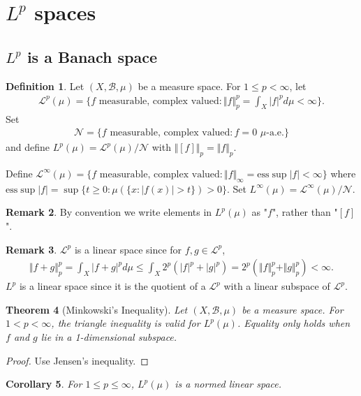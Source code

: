 \documentclass[11pt]{amsart}
\newtheorem{theorem}{Theorem}[section]
\newtheorem{corollary}[theorem]{Corollary}
\theoremstyle{definition}
\newtheorem{definition}[theorem]{Definition}
\newtheorem{remark}[theorem]{Remark}
\numberwithin{equation}{section}
\begin{document}
\section{\texorpdfstring{$L^p$}{Lp} spaces}
\subsection{\texorpdfstring{$L^p$}{Lp} is a Banach space}
\begin{definition}
    Let $(X,\mathcal B,\mu)$ be a measure space. For $1\le p<\infty$, let
    \begin{align*}
        \mathcal L^p(\mu)=\{f\text{ measurable, complex valued}:\Vert f\Vert_p^p=\int_X|f|^pd\mu<\infty\}.
    \end{align*}
    Set 
    \begin{align*}
        \mathcal N=\{f\text{ measurable, complex valued}:f=0\,\,\mu\text{-a.e.}\}
    \end{align*}
    and define $L^p(\mu)=\mathcal L^p(\mu)/\mathcal N$ with $\Vert [f]\Vert_p=\Vert f\Vert_p$.

    Define $\mathcal L^\infty(\mu)=\{f\text{ measurable, complex valued}:\Vert f\Vert_\infty=\mathrm{ess}\sup|f|<\infty\}$ where $\mathrm{ess}\sup|f|=\sup\{t\ge 0:\mu(\{x:|f(x)|>t\})>0\}$. Set $L^\infty(\mu)=\mathcal L^\infty(\mu)/\mathcal N$.
\end{definition}
\begin{remark}
    By convention we write elements in $L^p(\mu)$ as "$f$", rather than "$[f]$".
\end{remark}
\begin{remark}
    $\mathcal L^p$ is a linear space since for $f,g\in \mathcal L^p$, 
    \begin{align*}
        \Vert f+g\Vert_p^p=\int_X|f+g|^pd\mu\le\int_X2^p(|f|^p+|g|^p)=2^p(\Vert f\Vert_p^p+\Vert g\Vert_p^p)<\infty.
    \end{align*}
    $L^p$ is a linear space since it is the quotient of a $\mathcal L^p$ with a linear subspace of $\mathcal L^p$.
\end{remark}
\begin{theorem}[Minkowski's Inequality]
    Let $(X,\mathcal B,\mu)$ be a measure space. For $1<p<\infty$, the triangle inequality is valid for $L^p(\mu)$. Equality only holds when $f$ and $g$ lie in a 1-dimensional subspace.
\end{theorem}
\begin{proof}
    Use Jensen's inequality.
\end{proof}
\begin{corollary}
    For $1\le p\le \infty$, $L^p(\mu)$ is a normed linear space.
\end{corollary}
\end{document}
